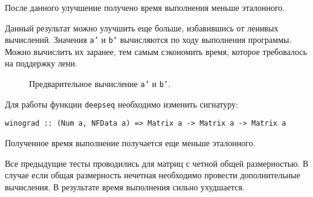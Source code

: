 \documentclass[a4paper,12pt,russian]{article}
\begin{document}
	После данного улучшение получено время выполнения меньше эталонного.
	
	
	Данный результат можно улучшить еще больше, избавившись от ленивых вычислений. Значения \texttt{a'} и \texttt{b'} вычисляются по ходу выполнения программы. Можно вычислить их заранее, тем самым сэкономить время, которое требовалось на поддержку лени. 
	
	\begin{figure}[H]
		\caption{Предварительное вычисление \texttt{a'} и \texttt{b'}.}
		
	\end{figure}
	
	Для работы функции \texttt{deepseq} необходимо изменить сигнатуру:
	
	\begin{lstlisting} 
winograd :: (Num a, NFData a) => Matrix a -> Matrix a -> Matrix a
	\end{lstlisting}
	
	Полученное время выполнение получается еще меньше эталонного.
	
	
	Все предыдущие тесты проводились для матриц с четной общей размерностью. В случае если общая размерность нечетная необходимо провести дополнительные вычисления. 
	В результате время выполнения сильно ухудшается.
	
	
\end{document}
